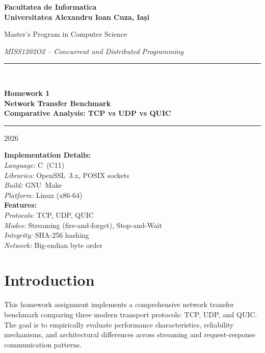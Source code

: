 \documentclass[12pt,a4paper]{article}
\begin{document}
\begin{titlepage}
  \centering
  \vspace*{1.5cm}
  {\LARGE\bfseries Facultatea de Informatica\\[0.4em]
   Universitatea Alexandru Ioan Cuza, Iași\par}
  \vspace{0.5cm}
  {\large Master's Program in Computer Science\par}
  \vspace{1.5cm}
  {\large\itshape MISS1202O2 – Concurrent and Distributed Programming\par}
  \vspace{2.5cm}
  \rule{\linewidth}{2pt}\\[0.8em]
  {\Huge\bfseries Homework 1\\[0.4em]
   Network Transfer Benchmark\\[0.3em]
   {\large Comparative Analysis: TCP vs UDP vs QUIC}\par}
  \rule{\linewidth}{2pt}
  \vspace{3cm}
  {\large 2026\par}
  \vfill
  {\normalsize
   \textbf{Implementation Details:}\\[0.3em]
   \textit{Language:} C~(C11)\\
   \textit{Libraries:} OpenSSL~3.x, POSIX sockets\\
   \textit{Build:} GNU~Make\\[0.5em]
   \textit{Platform:} Linux (x86-64)\\[0.3em]
   \textbf{Features:}\\
   \textit{Protocols:} TCP, UDP, QUIC\\
   \textit{Modes:} Streaming (fire-and-forget), Stop-and-Wait\\
   \textit{Integrity:} SHA-256 hashing\\
   \textit{Network:} Big-endian byte order}
\end{titlepage}

\tableofcontents
\newpage

\section{Introduction}
\label{sec:intro}

This homework assignment implements a comprehensive network transfer benchmark comparing three modern transport protocols: TCP, UDP, and QUIC. The goal is to empirically evaluate performance characteristics, reliability mechanisms, and architectural differences across streaming and request-response communication patterns.
\end{document}

